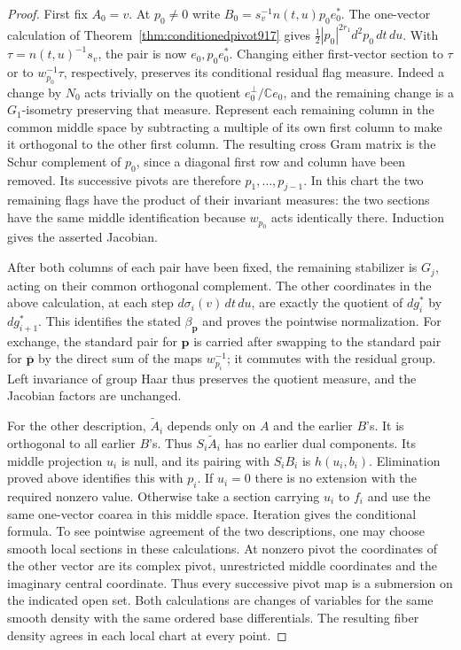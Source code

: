 \documentclass[a4paper,11pt]{article}
\theoremstyle{definition}
\theoremstyle{remark}
\numberwithin{equation}{section}
\begin{document}
\begin{proof}
First fix \(A_0=v\). At \(p_0\ne0\) write
\(B_0=s_v^{-1}n(t,u)p_0e_0^*\). The one-vector calculation
of Theorem~\ref{thm:conditionedpivot917} gives
\(\tfrac12 |p_0|^{2r_1}d^2p_0\,dt\,du\).
With \(\tau=n(t,u)^{-1}s_v\), the pair is now \(e_0,p_0e_0^*\).
Changing either first-vector section to \(\tau\) or to
\(w_{p_0}^{-1}\tau\), respectively, preserves its conditional
residual flag measure. Indeed a change by \(N_0\) acts trivially
on the quotient \(e_0^\perp/\mathbb C e_0\), and the remaining
change is a \(G_1\)-isometry preserving that measure.
Represent each remaining column in the common middle space
by subtracting a multiple of its own first column to make it
orthogonal to the other first column. The resulting cross Gram
matrix is the Schur complement of \(p_0\), since a diagonal
first row and column have been removed. Its successive pivots
are therefore \(p_1,\ldots,p_{j-1}\). In this chart the two
remaining flags have the product of their invariant measures:
the two sections have the same middle identification because
\(w_{p_0}\) acts identically there. Induction gives the asserted
Jacobian.

After both columns of each pair have been fixed, the remaining
stabilizer is \(G_j\), acting on their common orthogonal
complement. The other coordinates in the above calculation,
at each step \(d\sigma_i(v)\,dt\,du\), are exactly the quotient
of \(dg_i^*\) by \(dg_{i+1}^*\). This identifies the stated
\(\beta_{\mathbf p}\) and proves the pointwise normalization.
For exchange, the standard pair for \(\mathbf p\) is carried
after swapping to the standard pair for \(\overline{\mathbf p}\)
by the direct sum of the maps \(w_{p_i}^{-1}\); it commutes
with the residual group. Left invariance of group Haar thus
preserves the quotient measure, and the Jacobian factors
are unchanged.

For the other description, \(\widetilde A_i\) depends only on
\(A\) and the earlier \(B\)'s. It is orthogonal to all earlier
\(B\)'s. Thus \(S_i\widetilde A_i\) has no earlier dual components.
Its middle projection \(u_i\) is null, and its pairing with
\(S_iB_i\) is \(h(u_i,b_i)\). Elimination proved above identifies
this with \(p_i\). If \(u_i=0\) there is no extension with the
required nonzero value. Otherwise take a section carrying \(u_i\)
to \(f_i\) and use the same one-vector coarea in this middle
space. Iteration gives the conditional formula. To see pointwise
agreement of the two descriptions, one may choose smooth local
sections in these calculations. At nonzero pivot the coordinates
of the other vector are its complex pivot, unrestricted middle
coordinates and the imaginary central coordinate. Thus every
successive pivot map is a submersion on the indicated open set.
Both calculations are changes of variables for the same smooth
density with the same ordered base differentials. The resulting
fiber density agrees in each local chart at every point.
\end{proof}
\end{document}
